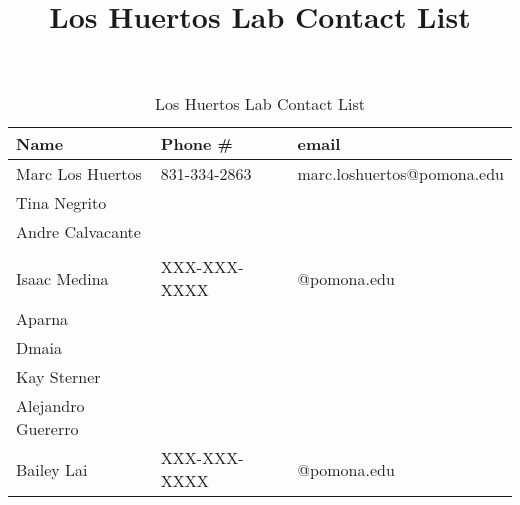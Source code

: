 \documentclass{article}
\title{Los Huertos Lab Contact List}
\begin{document}


\begin{table}[tp]
\caption{Los Huertos Lab Contact List}
\begin{tabular}{lll}\hline
Name                & Phone \#      & email   \\ \hline
Marc Los Huertos    & 831-334-2863  & marc.loshuertos@pomona.edu \\
Tina Negrito        &               & \\
Andre Calvacante    &               & \\
\\

Isaac Medina        & XXX-XXX-XXXX  & @pomona.edu \\
Aparna              &&\\
Dmaia               &&\\
Kay Sterner         &               & \\
Alejandro Guererro  &               & \\           
Bailey Lai          & XXX-XXX-XXXX  & @pomona.edu \\\hline
\end{tabular}
\end{table}
\end{document}
